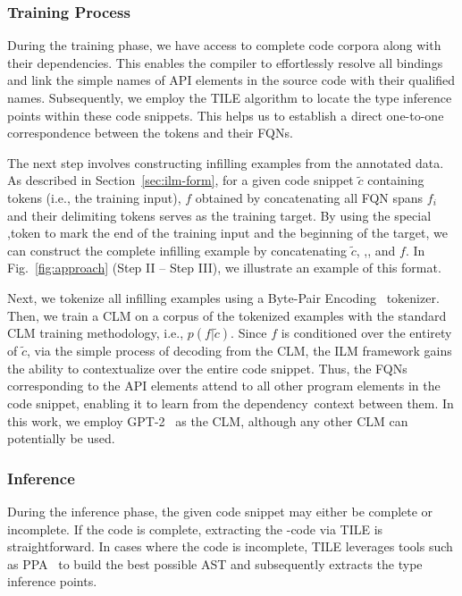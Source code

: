 \subsubsection{Training Process}
\label{sec:ilm-train}
During the training phase, we have access to complete code corpora along with their dependencies. This enables the compiler to effortlessly resolve all bindings and link the simple names of API elements in the source code with their qualified names. Subsequently, we employ the TILE algorithm to locate the type inference points within these code snippets. This helps us to establish a direct one-to-one correspondence between the \blank tokens and their FQNs.

The next step involves constructing infilling examples from the annotated data. As described in Section~\ref{sec:ilm-form}, 
for a given code snippet $\tilde{c}$ containing \blank tokens (i.e., the training input), $f$ obtained by concatenating all FQN spans $f_i$ and their delimiting \answer tokens serves as the training target. By using the special \sep token to mark the end of the training input and the beginning of the target, we can construct the complete infilling example by concatenating $\tilde{c}$, \sep, and $f$. In Fig.~\ref{fig:approach} (Step II -- Step III), we illustrate an example of this format.

Next, we tokenize all infilling examples using a Byte-Pair Encoding~\cite{radford2019language} tokenizer. Then, we train a CLM on a corpus of the tokenized examples with the standard CLM training methodology, i.e., $p(f|\tilde{c})$. Since $f$ is conditioned over the entirety of $\tilde{c}$, via the simple process of decoding from the CLM, the ILM framework gains the ability to contextualize over the entire code snippet. Thus, the FQNs corresponding to the API elements attend to all other program elements in the code snippet, enabling it to learn from the dependency~context between them. In this work, we employ GPT-2~\cite{radford2019language} as the CLM, although any other CLM can potentially be used.


\subsubsection{Inference}
\label{sec:ilm-infer}
During the inference phase, the given code snippet may either be complete or incomplete.
If the code is complete, extracting the \blank-code via TILE is straightforward. In cases where the code is incomplete, TILE leverages tools such as PPA~\cite{dagenais-oopsla08} to build the best possible AST and subsequently extracts the type inference points.


